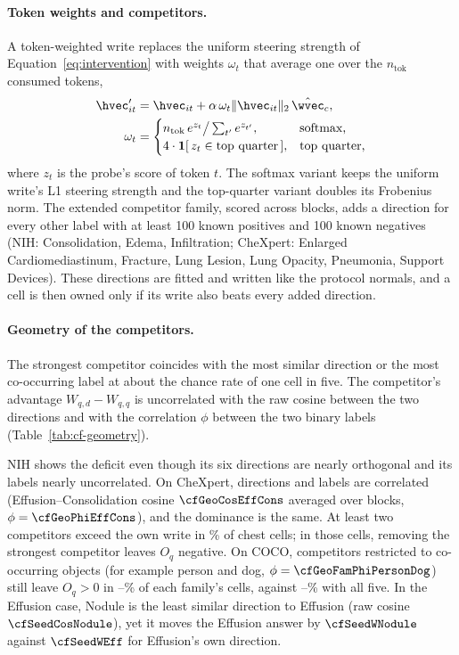 \paragraph{Token weights and competitors.} A token-weighted write replaces the uniform steering strength of Equation~\ref{eq:intervention} with weights $\omega_t$ that average one over the $n_{\mathrm{tok}}$ consumed tokens,
\begin{equation}
\begin{aligned}
\hvec'_{it}&=\hvec_{it}+\alpha\,\omega_t\lVert\hvec_{it}\rVert_2\,\hat\wvec_c,\\
\omega_t&=\begin{cases}
n_{\mathrm{tok}}\,e^{z_t}\big/\sum_{t'}e^{z_{t'}}, & \text{softmax,}\\
4\cdot\mathbf 1[\,z_t\in\text{top quarter}\,], & \text{top quarter,}
\end{cases}
\end{aligned}
\label{eq:token-weights}
\end{equation}
where $z_t$ is the probe's score of token $t$. The softmax variant keeps the uniform write's L1 steering strength and the top-quarter variant doubles its Frobenius norm. The extended competitor family, scored across \cfExtcompBlocks{} blocks, adds a direction for every other label with at least 100 known positives and 100 known negatives (NIH: Consolidation, Edema, Infiltration; CheXpert: Enlarged Cardiomediastinum, Fracture, Lung Lesion, Lung Opacity, Pneumonia, Support Devices). These directions are fitted and written like the protocol normals, and a cell is then owned only if its write also beats every added direction.



\paragraph{Geometry of the competitors.} The strongest competitor coincides with the most similar direction or the most co-occurring label at about the chance rate of one cell in five. The competitor's advantage $W_{q,d}-W_{q,q}$ is uncorrelated with the raw cosine between the two directions and with the correlation $\phi$ between the two binary labels (Table~\ref{tab:cf-geometry}).

NIH shows the deficit even though its six directions are nearly orthogonal and its labels nearly uncorrelated. On CheXpert, directions and labels are correlated (Effusion--Consolidation cosine $\cfGeoCosEffCons$ averaged over blocks, $\phi=\cfGeoPhiEffCons$), and the dominance is the same. At least two competitors exceed the own write in \cfGeoTwoAbovePct\% of chest cells; in those cells, removing the strongest competitor leaves $O_q$ negative. On COCO, competitors restricted to co-occurring objects (for example person and dog, $\phi=\cfGeoFamPhiPersonDog$) still leave $O_q>0$ in \cfGeoCocoFamMinPct{}--\cfGeoCocoFamMaxPct\% of each family's cells, against \cfGeoCocoFamFullMinPct{}--\cfGeoCocoFamFullMaxPct\% with all five. In the Effusion case, Nodule is the least similar direction to Effusion (raw cosine $\cfSeedCosNodule$), yet it moves the Effusion answer by $\cfSeedWNodule$ against $\cfSeedWEff$ for Effusion's own direction.

